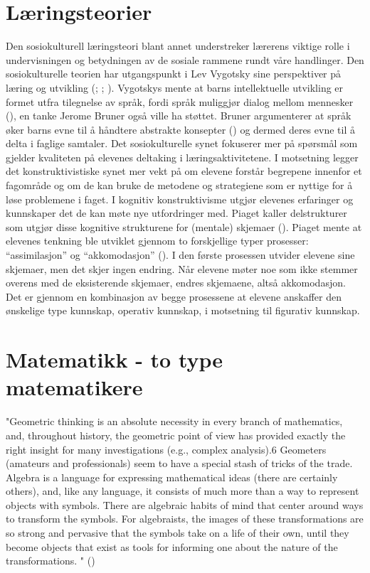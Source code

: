 \documentclass[12pt,twoside,onecolumn,norsk]{article}
\begin{document}
\section*{Læringsteorier}
Den sosiokulturell læringsteori blant annet understreker lærerens viktige rolle i undervisningen og 
betydningen av de sosiale rammene rundt våre handlinger. Den sosiokulturelle teorien har utgangspunkt 
i Lev Vygotsky sine perspektiver på læring og utvikling (; ; 
). Vygotskys mente at barns intellektuelle utvikling er formet utfra tilegnelse 
av språk, fordi språk muliggjør dialog mellom mennesker (), en tanke Jerome Bruner 
også ville ha støttet. Bruner argumenterer at språk øker barns evne til å håndtere abstrakte konsepter 
()  og dermed deres evne til å delta i faglige samtaler. Det sosiokulturelle synet 
fokuserer mer på spørsmål som gjelder kvaliteten på elevenes deltaking i læringsaktivitetene. I 
motsetning legger det konstruktivistiske synet mer vekt på om elevene forstår begrepene innenfor et 
fagområde og om de kan bruke de metodene og strategiene som er nyttige for å løse problemene i faget.
\newline
\newline
I kognitiv konstruktivisme utgjør elevenes erfaringer og kunnskaper det de kan møte nye utfordringer 
med. Piaget kaller delstrukturer som utgjør disse kognitive strukturene for (mentale) skjemaer 
(). Piaget mente at elevenes tenkning ble utviklet gjennom to forskjellige 
typer prosesser: ``assimilasjon'' og ``akkomodasjon'' (). I den første 
prosessen utvider elevene sine skjemaer, men det skjer ingen endring. Når elevene møter noe 
som ikke stemmer overens med de eksisterende skjemaer, endres skjemaene, altså akkomodasjon. 
Det er gjennom en kombinasjon av begge prosessene at elevene anskaffer den ønskelige type 
kunnskap, operativ kunnskap, i motsetning til figurativ kunnskap.

\section*{Matematikk - to type matematikere}
"Geometric thinking is an absolute necessity in every branch of mathematics, and,
throughout history, the geometric point of view has provided exactly the right
insight for many investigations (e.g., complex analysis).6 Geometers (amateurs
and professionals) seem to have a special stash of tricks of the trade. 
\newline
\newline
Algebra is a language for expressing mathematical ideas (there are certainly
others), and, like any language, it consists of much more than a way to represent
objects with symbols. There are algebraic habits of mind that center around ways
to transform the symbols. For algebraists, the images of these transformations
are so strong and pervasive that the symbols take on a life of their own, until they
become objects that exist as tools for informing one about the nature of the
transformations. " ()
\end{document}
